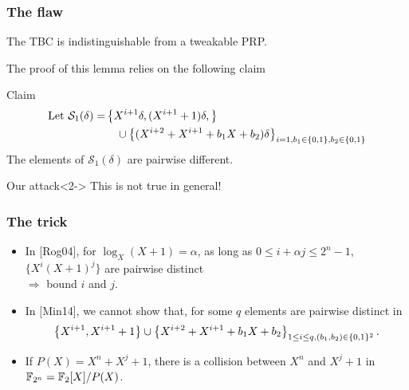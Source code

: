 \documentclass{beamer}
\begin{document}
	\begin{frame}
		\frametitle{The flaw}

		\begin{lemma}[{Lemma 1 of [Min14]}]
			The TBC is indistinguishable from a tweakable PRP.
		\end{lemma}
		The proof of this lemma relies on the following claim
		\begin{block}{Claim}
		\begin{align*}
		\mbox{Let }\mathcal{S}_1(\delta) = & \left\{X^{i+1}\delta, (X^{i+1} +1)\delta,\right\} \\
		 &\ \ \  \cup \left\{ (X^{i+2} + X^{i+1} + b_1 X + b_2)\delta \right\}_{i=1, b_1 \in \{0, 1\}, b_2 \in \{0, 1\}} 
		\end{align*}
		The elements of $\mathcal{S}_1(\delta)$
		are pairwise different.
		\end{block}
	
		\begin{alertblock}{Our attack}<2->
			This is not true in general!
		\end{alertblock}

	\end{frame}

	\begin{frame}
		\frametitle{The trick}

		\begin{itemize}
			\item In [Rog04], for $\log_X (X+1) = \alpha$, as long as $0 \leq i + \alpha j \leq 2^{n}-1$, $\{X^i (X+1)^j\}$ are pairwise distinct 
			\\ \tab $\Rightarrow$ bound $i$ and $j$.
			
			\item<2-> In [Min14], we cannot show that, for some $q$ elements are pairwise distinct in 
				\[
				\left\{X^{i+1}, X^{i+1} +1 \right\} \cup \left\{ X^{i+2} + X^{i+1} + b_1 X + b_2\right\}_{1\leq i \leq q, (b_1,b_2) \in \{0, 1\}^2}.
				\]
		
			\item<3-> If $P(X) = X^n + X^j + 1$, there is a collision between $X^n$ and $X^j + 1$ in $\mathbb{F}_{2^n} = \mathbb{F}_2[X]/P(X)$.
		\end{itemize}
	\end{frame}
\end{document}
